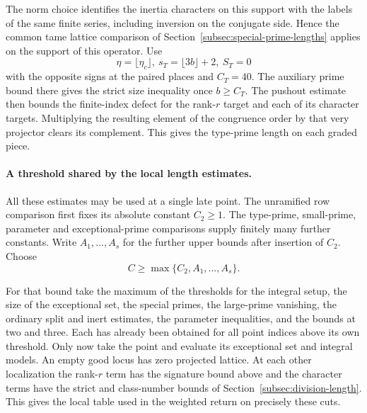 The
norm choice identifies the inertia characters on this
support with the labels of the same finite series, including
inversion on the conjugate side. Hence the common tame
lattice comparison of Section~\ref{subsec:special-prime-lengths}
applies on the support of this operator. Use
\[
 \eta=\lfloor\eta_c\rfloor,\ s_T=\lfloor3b\rfloor+2,\ S_T=0
\]
with the opposite signs at the paired places and \(C_T=40\).
The auxiliary prime bound there gives the strict size inequality
once \(b\ge C_T\). The pushout estimate then bounds the
finite-index defect for the rank-\(r\) target and each of
its character targets. Multiplying the resulting element
of the congruence order by that very projector clears its
complement. This gives the type-prime length on each graded
piece. \label{cor:marked-localization-9}

\paragraph{A threshold shared by the local length estimates.}
All these estimates may be used at a single late point.
The unramified row comparison first fixes its absolute
constant \(C_2\ge1\). The type-prime, small-prime, parameter
and exceptional-prime comparisons supply finitely many
further constants. Write \(A_1,\ldots,A_s\) for the further upper bounds after insertion of \(C_2\). Choose
\[
 C\ge\max\{C_2,A_1,\ldots,A_s\}.
\]

For
that bound take the maximum of the thresholds for the
integral setup, the size of the exceptional set, the
special primes, the large-prime vanishing, the ordinary
split and inert estimates, the parameter inequalities,
and the bounds at two and three. Each has already been
obtained for all point indices above its own threshold.
Only now take the point and evaluate its exceptional set
and integral models. An empty good locus has zero projected
lattice. At each other localization the rank-\(r\) term has
the signature bound above and the character terms have
the strict and class-number bounds of
Section~\ref{subsec:division-length}. This gives the local
table used in the weighted return on precisely these cuts.
\label{cor:marked-localization-10}
